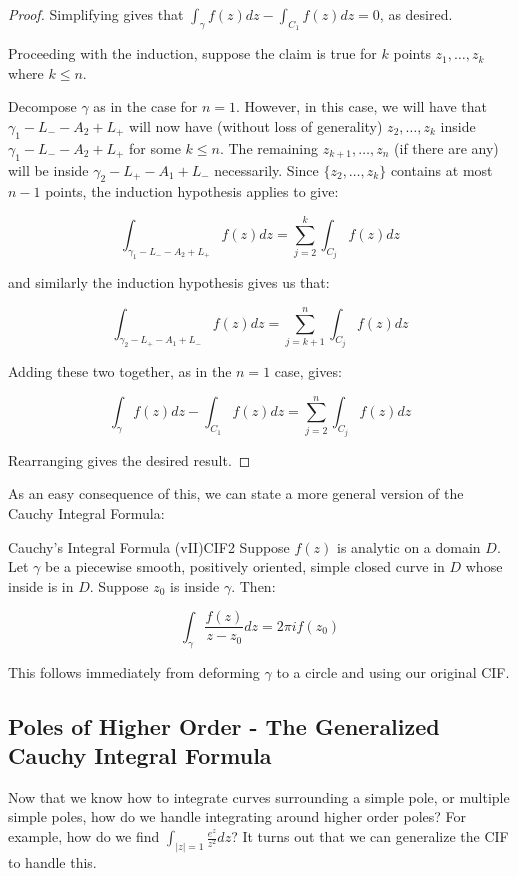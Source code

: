 \begin{proof}
Simplifying gives that $\int_{\gamma} f(z)dz - \int_{C_1}f(z)dz = 0$, as desired.

Proceeding with the induction, suppose the claim is true for $k$ points $z_1,\dots, z_k$ where $k\le n$.

Decompose $\gamma$ as in the case for $n = 1$. However, in this case, we will have that $\gamma_1 - L_- - A_2 + L_+$ will now have (without loss of generality) $z_2,\dots,z_k$ inside $\gamma_1 - L_- - A_2 + L_+$ for some $k\le n$. The remaining $z_{k+1},\dots,z_n$ (if there are any) will be inside $\gamma_2 - L_+ - A_1 + L_-$ necessarily. Since $\{z_2,\dots,z_k\}$ contains at most $n-1$ points, the induction hypothesis applies to give:

$$\int_{\gamma_1 - L_- - A_2 + L_+} f(z)dz = \sum_{j = 2}^k \int_{C_j} f(z)dz$$

\noin and similarly the induction hypothesis gives us that:

$$\int_{\gamma_2 - L_+ - A_1 + L_-} f(z)dz = \sum_{j = k+1}^n \int_{C_j} f(z)dz$$

Adding these two together, as in the $n=1$ case, gives:

$$\int_{\gamma} f(z)dz - \int_{C_1}f(z)dz = \sum_{j = 2}^n \int_{C_j}f(z)dz$$

Rearranging gives the desired result.
\end{proof}

As an easy consequence of this, we can state a more general version of the Cauchy Integral Formula:

\begin{corbo}{Cauchy's Integral Formula (vII)}{CIF2}
Suppose $f(z)$ is analytic on a domain $D$. Let $\gamma$ be a piecewise smooth, positively oriented, simple closed curve in $D$ whose inside is in $D$. Suppose $z_0$ is inside $\gamma$. Then:

$$\int_{\gamma} \frac{f(z)}{z-z_0}dz = 2\pi if(z_0)$$
\end{corbo}

This follows immediately from deforming $\gamma$ to a circle and using our original CIF.

\subsection{Poles of Higher Order - The Generalized Cauchy Integral Formula}

Now that we know how to integrate curves surrounding a simple pole, or multiple simple poles, how do we handle integrating around higher order poles? For example, how do we find $\int_{|z|=1}\frac{e^z}{z^2}dz$? It turns out that we can generalize the CIF to handle this.

